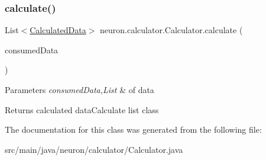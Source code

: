 \subsubsection{\texorpdfstring{calculate()}{calculate()}}
{\footnotesize\ttfamily List$<$\hyperlink{classneuron_1_1entities_1_1CalculatedData}{Calculated\+Data}$>$ neuron.\+calculator.\+Calculator.\+calculate (\begin{DoxyParamCaption}\item[{List$<$ \hyperlink{classneuron_1_1entities_1_1Data}{Data} $>$}]{consumed\+Data }\end{DoxyParamCaption})}


\begin{DoxyParams}{Parameters}
{\em consumed\+Data,List} & of data \\
\hline
\end{DoxyParams}
\begin{DoxyReturn}{Returns}
calculated data\+Calculate list class 
\end{DoxyReturn}


The documentation for this class was generated from the following file\+:\begin{DoxyCompactItemize}
\item 
src/main/java/neuron/calculator/Calculator.\+java\end{DoxyCompactItemize}
